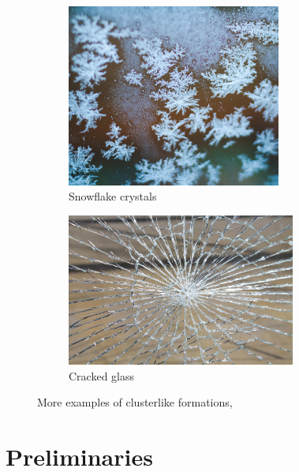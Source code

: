 \documentclass[12pt,a4paper]{scrartcl}
\newcommand{\1}{\mathbbm{1}}
\theoremstyle{definition}
\numberwithin{equation}{section}
\begin{document}
\vspace*{\fill}

\begin{figure}[]
	\centering
	\begin{subfigure}[b]{.45\textwidth}
		\includegraphics[height=6cm]{images/snowflake.png}
		\caption{Snowflake crystals} 
	\end{subfigure}
	\begin{subfigure}[b]{.52\textwidth}
		\includegraphics[height=5cm]{images/glass-break.jpg}
		\caption{Cracked glass} 
	\end{subfigure}
	\caption{More examples of clusterlike formations, \cite{unsplash}}
	\label{other}
\end{figure}




\newpage


\section{Preliminaries} \label{prelim}
\end{document}
